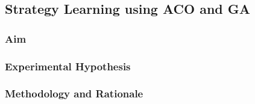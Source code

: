\subsection{Strategy Learning using ACO and GA}
\subsubsection{Aim}
\subsubsection{Experimental Hypothesis}
\subsubsection{Methodology and Rationale}


